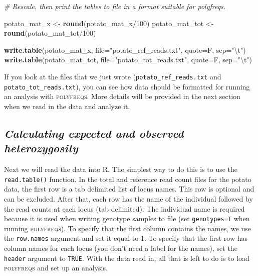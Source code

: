 \documentclass[]{article}
\newenvironment{Shaded}{\begin{snugshade}}{\end{snugshade}}
\newcommand{\KeywordTok}[1]{\textcolor[rgb]{0.13,0.29,0.53}{\textbf{{#1}}}}
\newcommand{\DataTypeTok}[1]{\textcolor[rgb]{0.13,0.29,0.53}{{#1}}}
\newcommand{\DecValTok}[1]{\textcolor[rgb]{0.00,0.00,0.81}{{#1}}}
\newcommand{\CharTok}[1]{\textcolor[rgb]{0.31,0.60,0.02}{{#1}}}
\newcommand{\StringTok}[1]{\textcolor[rgb]{0.31,0.60,0.02}{{#1}}}
\newcommand{\CommentTok}[1]{\textcolor[rgb]{0.56,0.35,0.01}{\textit{{#1}}}}
\newcommand{\NormalTok}[1]{{#1}}
\begin{document}
\begin{Shaded}
\begin{Highlighting}[]
\CommentTok{# Rescale, then print the tables to file in a format suitable for polyfreqs.}

\NormalTok{potato_mat_x <-}\StringTok{ }\KeywordTok{round}\NormalTok{(potato_mat_x/}\DecValTok{100}\NormalTok{)}
\NormalTok{potato_mat_tot <-}\StringTok{ }\KeywordTok{round}\NormalTok{(potato_mat_tot/}\DecValTok{100}\NormalTok{)}

\KeywordTok{write.table}\NormalTok{(potato_mat_x, }\DataTypeTok{file=}\StringTok{"potato_ref_reads.txt"}\NormalTok{, }\DataTypeTok{quote=}\NormalTok{F, }\DataTypeTok{sep=}\StringTok{"}\CharTok{\textbackslash{}t}\StringTok{"}\NormalTok{)}
\KeywordTok{write.table}\NormalTok{(potato_mat_tot, }\DataTypeTok{file=}\StringTok{"potato_tot_reads.txt"}\NormalTok{, }\DataTypeTok{quote=}\NormalTok{F, }\DataTypeTok{sep=}\StringTok{"}\CharTok{\textbackslash{}t}\StringTok{"}\NormalTok{)}
\end{Highlighting}
\end{Shaded}

\newpage

If you look at the files that we just wrote
(\texttt{potato\_ref\_reads.txt} and \texttt{potato\_tot\_reads.txt}),
you can see how data should be formatted for running an analysis with
\textsc{polyfreqs}. More details will be provided in the next section
when we read in the data and analyze it.

\subsection{\texorpdfstring{\emph{Calculating expected and observed
heterozygosity}}{Calculating expected and observed heterozygosity}}\label{calculating-expected-and-observed-heterozygosity}

Next we will read the data into R. The simplest way to do this is to use
the \texttt{read.table()} function. In the total and reference read
count files for the potato data, the first row is a tab delimited list
of locus names. This row is optional and can be excluded. After that,
each row has the name of the individual followed by the read counts at
each locus (tab delimited). The individual name is required because it
is used when writing genotype samples to file (set \texttt{genotypes=T}
when running \textsc{polyfreqs}). To specify that the first column
contains the names, we use the \texttt{row.names} argument and set it
equal to 1. To specify that the first row has column names for each
locus (you don't need a label for the names), set the \texttt{header}
argument to \texttt{TRUE}. With the data read in, all that is left to do
is to load \textsc{polyfreqs} and set up an analysis.
\end{document}
